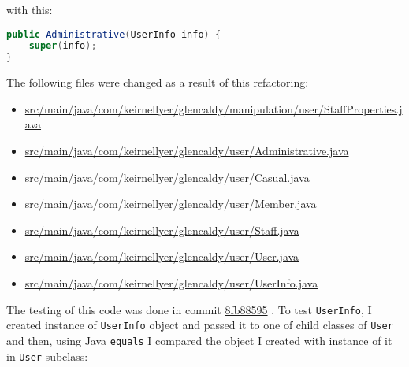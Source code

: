 \documentclass{article}
\newcommand{\code}[1]{\texttt{#1}}
\newcommand{\gh}[1]{%
  \href{https://github.com/awave1/assessment-loan-system/commit/#1}{#1}%
}
\begin{document}
\noindent with this:
\begin{lstlisting}[language=Java]
public Administrative(UserInfo info) {
    super(info);
}
\end{lstlisting}

The following files were changed as a result of this refactoring:
\begin{itemize}
  \item \href{https://github.com/awave1/assessment-loan-system/commit/fcaddaa808bff70b463e9c852aa1653040a01ab8?diff=split#diff-5a0e9b14541283daee7c9eed50aa74cc}{src/main/java/com/keirnellyer/glencaldy/manipulation/user/StaffProperties.java}
  \item \href{https://github.com/awave1/assessment-loan-system/commit/fcaddaa808bff70b463e9c852aa1653040a01ab8?diff=split#diff-4a7373ea05df51d34c2533824251b057}{src/main/java/com/keirnellyer/glencaldy/user/Administrative.java}
  \item \href{https://github.com/awave1/assessment-loan-system/commit/fcaddaa808bff70b463e9c852aa1653040a01ab8?diff=split#diff-7338aa10a391d939436dc47f59059277}{src/main/java/com/keirnellyer/glencaldy/user/Casual.java}
  \item \href{https://github.com/awave1/assessment-loan-system/commit/fcaddaa808bff70b463e9c852aa1653040a01ab8?diff=split#diff-7338aa10a391d939436dc47f59059277}{src/main/java/com/keirnellyer/glencaldy/user/Member.java}
  \item \href{https://github.com/awave1/assessment-loan-system/commit/fcaddaa808bff70b463e9c852aa1653040a01ab8?diff=split#diff-87bac8dd50b911a677e2d06aa0e2e5a3}{src/main/java/com/keirnellyer/glencaldy/user/Staff.java}
  \item \href{https://github.com/awave1/assessment-loan-system/commit/fcaddaa808bff70b463e9c852aa1653040a01ab8?diff=split#diff-5e515c5505a969c1bd2e93523ab6c124}{src/main/java/com/keirnellyer/glencaldy/user/User.java}
  \item \href{https://github.com/awave1/assessment-loan-system/commit/fcaddaa808bff70b463e9c852aa1653040a01ab8?diff=split#diff-88553ab84e0d52c8cedbc9e311377b99}{src/main/java/com/keirnellyer/glencaldy/user/UserInfo.java}
\end{itemize}

The testing of this code was done in commit \gh{8fb88595}. To test \code{UserInfo}, I created instance of \code{UserInfo} object and passed it to one of child classes of \code{User} and then, using Java \code{equals} I compared the object I created with instance of it in \code{User} subclass:
\end{document}

